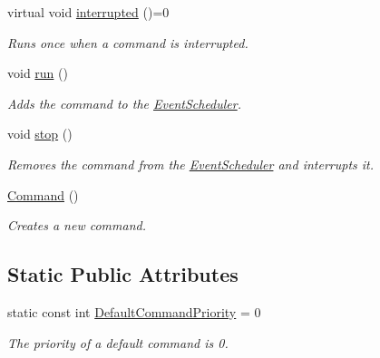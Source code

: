\begin{DoxyCompactItemize}
\mbox{\label{classlib_iterative_robot_1_1_command_a1c17b601d1b69822cabadb92069d1747}} 
virtual void \mbox{\hyperlink{classlib_iterative_robot_1_1_command_a1c17b601d1b69822cabadb92069d1747}{interrupted}} ()=0
\begin{DoxyCompactList}\small\item\em Runs once when a command is interrupted. \end{DoxyCompactList}\item 
\mbox{\label{classlib_iterative_robot_1_1_command_a3f3790d1b8033d7253a9f44481032ee9}} 
void \mbox{\hyperlink{classlib_iterative_robot_1_1_command_a3f3790d1b8033d7253a9f44481032ee9}{run}} ()
\begin{DoxyCompactList}\small\item\em Adds the command to the \mbox{\hyperlink{classlib_iterative_robot_1_1_event_scheduler}{Event\+Scheduler}}. \end{DoxyCompactList}\item 
\mbox{\label{classlib_iterative_robot_1_1_command_ac91308101424f447f80665244b554171}} 
void \mbox{\hyperlink{classlib_iterative_robot_1_1_command_ac91308101424f447f80665244b554171}{stop}} ()
\begin{DoxyCompactList}\small\item\em Removes the command from the \mbox{\hyperlink{classlib_iterative_robot_1_1_event_scheduler}{Event\+Scheduler}} and interrupts it. \end{DoxyCompactList}\item 
\mbox{\hyperlink{classlib_iterative_robot_1_1_command_a18df2d81039392daeb0b78c346a70537}{Command}} ()
\begin{DoxyCompactList}\small\item\em Creates a new command. \end{DoxyCompactList}\end{DoxyCompactItemize}
\subsection*{Static Public Attributes}
\begin{DoxyCompactItemize}
\item 
\mbox{\label{classlib_iterative_robot_1_1_command_a37cc89119a9f76d0dda57ea21c877c7c}} 
static const int \mbox{\hyperlink{classlib_iterative_robot_1_1_command_a37cc89119a9f76d0dda57ea21c877c7c}{Default\+Command\+Priority}} = 0
\begin{DoxyCompactList}\small\item\em The priority of a default command is 0. \end{DoxyCompactList}\end{DoxyCompactItemize}

